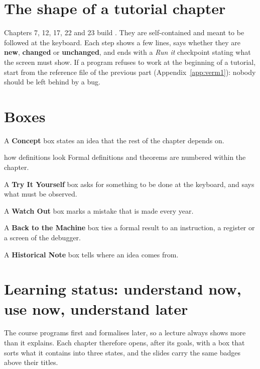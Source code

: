 \section*{The shape of a tutorial chapter}

Chapters 7, 12, 17, 22 and 23 build \vermone. They are self-contained and
meant to be followed at the keyboard. Each step shows a few lines, says
whether they are \textbf{new}, \textbf{changed} or \textbf{unchanged}, and ends
with a \emph{Run it} checkpoint stating what the screen must show. If a
program refuses to work at the beginning of a tutorial, start from the
reference file of the previous part (Appendix~\ref{app:verm1}): nobody should
be left behind by a bug.

\section*{Boxes}

\begin{prgconcept}
A \textbf{Concept} box states an idea that the rest of the chapter depends on.
\end{prgconcept}
\begin{definition}{how definitions look}
Formal definitions and theorems are numbered within the chapter.
\end{definition}
\begin{prgtry}
A \textbf{Try It Yourself} box asks for something to be done at the keyboard,
and says what must be observed.
\end{prgtry}
\begin{prgwarn}
A \textbf{Watch Out} box marks a mistake that is made every year.
\end{prgwarn}
\begin{prgmachine}
A \textbf{Back to the Machine} box ties a formal result to an instruction, a
register or a screen of the debugger.
\end{prgmachine}
\begin{prgaside}
A \textbf{Historical Note} box tells where an idea comes from.
\end{prgaside}

\section*{Learning status: understand now, use now, understand later}

The course programs first and formalises later, so a lecture always shows more than it
explains. Each chapter therefore opens, after its goals, with a box that sorts what it
contains into three states, and the slides carry the same badges above their titles.


